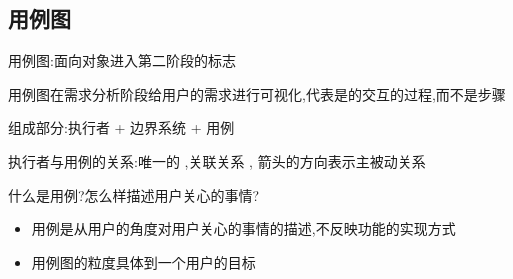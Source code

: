 \documentclass[UTF8,a4paper]{ctexart}
\begin{document}
\subsection{用例图}
用例图:面向对象进入第二阶段的标志

用例图在需求分析阶段给用户的需求进行可视化,代表是的交互的过程,而不是步骤

组成部分:执行者 + 边界系统 + 用例

执行者与用例的关系:唯一的 ,关联关系 , 箭头的方向表示主被动关系

什么是用例?怎么样描述用户关心的事情?
\begin{itemize}
  \item 用例是从用户的角度对用户关心的事情的描述,不反映功能的实现方式
  \item 用例图的粒度具体到一个用户的目标
\end{itemize}
\end{document}
